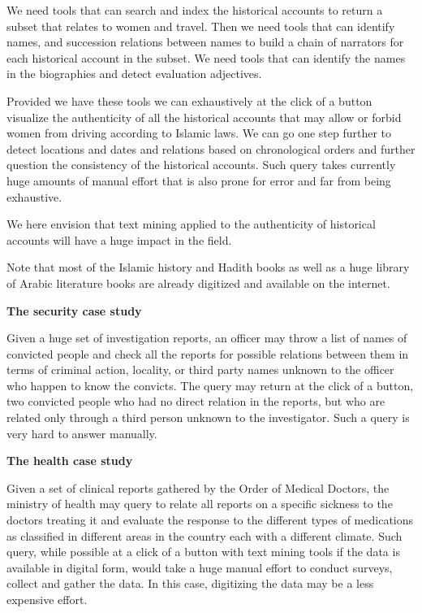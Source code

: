 \documentclass[12pt]{article}
\begin{document}
We need tools that can search and index the historical accounts to return a subset that relates to women and travel.
 Then we need tools that can identify names, and succession relations between names to build a chain of narrators for each historical account in the subset.
 We need tools that can identify the names in the biographies and detect evaluation adjectives.
 
Provided we have these tools we can exhaustively at the click of a button visualize the authenticity of all the historical accounts that may allow or forbid women from driving according to Islamic laws.
 We can go one step further to detect locations and dates and relations based on chronological orders and further question the consistency of the historical accounts.
 Such query takes currently huge amounts of manual effort that is also prone for error and far from being exhaustive.
 
We here envision that text mining applied to the authenticity of historical accounts will have a huge impact in the field.

Note that most of the Islamic history and Hadith books as well as a huge library of Arabic literature books are already digitized and available on the internet.

{\bf The security case study}

Given a huge set of investigation reports, an officer may throw a list of names of convicted people and check all the reports for possible relations between them in terms of criminal action, locality, or third party names unknown to the officer who happen to know the convicts.
 The query may return at the click of a button, two convicted people who had no direct relation in the reports, but who are related only through a third person unknown to the investigator.
 Such a query is very hard to answer manually.

{\bf The health case study}

Given a set of clinical reports gathered by the Order of Medical Doctors, the ministry of health may query to relate all reports on a specific sickness to the doctors treating it and evaluate the response to the different types of medications as classified in different areas in the country each with a different climate.
 Such query, while possible at a click of a button with text mining tools if the data is available in digital form, would take a huge manual effort to conduct surveys, collect and gather the data.
 In this case, digitizing the data may be a less expensive effort.
\end{document}
